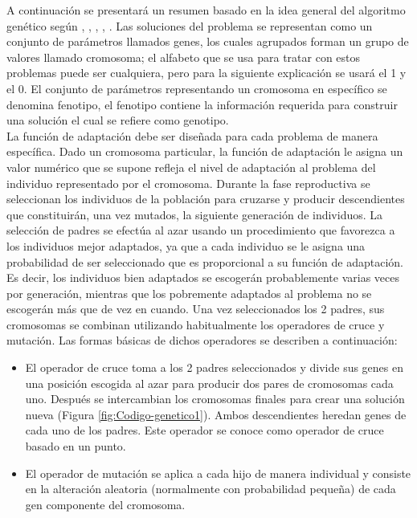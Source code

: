 \hspace*{1cm}A continuación se presentará un resumen basado en la idea general del algoritmo genético según \cite{[HOLLAND]}, \cite{[REEVES]}, \cite{[MICHALEWICZ]}, \cite{[DAVIS]},  \cite{[GOLDBERG]}. Las soluciones del problema se representan como un conjunto de parámetros llamados genes, los cuales agrupados forman un grupo de valores llamado cromosoma; el alfabeto que se usa para tratar con estos problemas puede ser cualquiera, pero para la siguiente explicación se usará el 1 y el 0. El conjunto de parámetros representando un cromosoma en específico se denomina fenotipo, el fenotipo contiene la información requerida para construir una solución el cual se refiere como genotipo.\\
\hspace*{1cm}La función de adaptación debe ser diseñada para cada problema de manera específica. Dado un cromosoma particular, la función de adaptación le asigna un valor numérico que se supone refleja el nivel de adaptación al problema del individuo representado por el cromosoma. Durante la fase reproductiva se seleccionan los individuos de la población para cruzarse y producir descendientes que constituirán, una vez mutados, la siguiente generación de individuos. La selección de padres se efectúa al azar usando un procedimiento que favorezca a los individuos mejor adaptados, ya que a cada individuo se le asigna una probabilidad de ser seleccionado que es proporcional a su función de adaptación. Es decir, los individuos bien adaptados se escogerán probablemente varias veces por generación, mientras que los pobremente adaptados al problema no se escogerán más que de vez en cuando. Una vez seleccionados los 2 padres, sus cromosomas se combinan utilizando habitualmente los operadores de cruce y mutación. Las formas básicas de dichos operadores se describen a continuación: 

\begin{itemize}
    \item El operador de cruce toma a los 2 padres seleccionados y divide sus genes en una posición escogida al azar para producir dos pares de cromosomas cada uno. Después se intercambian los cromosomas finales para crear una solución nueva (Figura \ref{fig:Codigo-genetico1}). Ambos descendientes heredan genes de cada uno de los padres. Este operador se conoce como operador de cruce basado en un punto.
    \item El operador de mutación se aplica a cada hijo de manera individual y consiste en la alteración aleatoria (normalmente con probabilidad pequeña) de cada gen componente del cromosoma.
\end{itemize}


